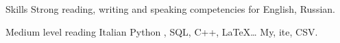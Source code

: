 
\begin{rubric}{Skills}
\entry*[Languages]
	Strong reading, writing and speaking competencies for English, Russian.\par Medium level reading Italian
	Python , SQL, C++,     LaTeX\ldots
\entry*[Databases]
	My, ite, CSV.
\end{rubric}
